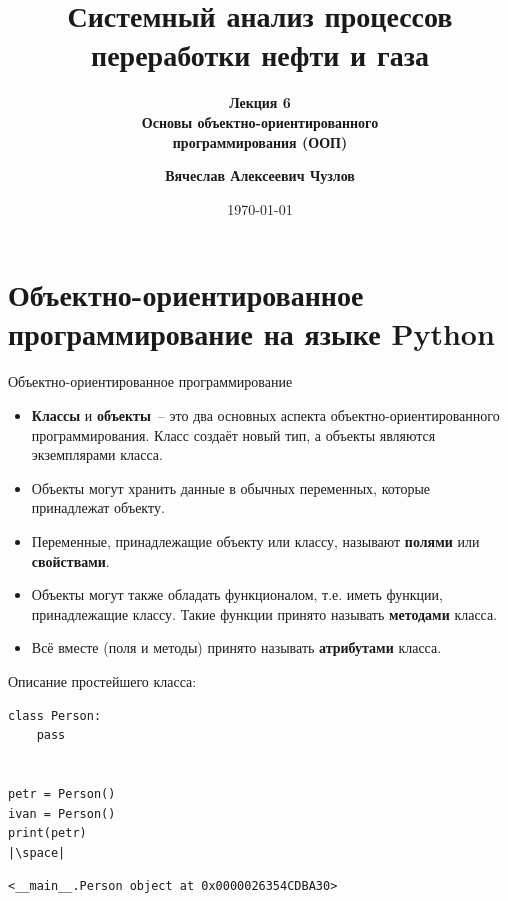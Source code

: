 \documentclass[aspectratio=169, mathserif]{beamer}	%
\title{\Large{Системный анализ процессов переработки нефти и газа}}
\subtitle{\textcolor{tpugreen}{\textbf{Лекция 6}} \\ \textbf{Основы объектно-ориентированного \\ программирования (ООП)}}
\author[]{\textbf{Вячеслав Алексеевич Чузлов}}
\institute{к.т.н., доцент ОХИ ИШПР}
\date{\today}
\begin{document}

\titleframe		%

\tocframe{}		%




\section{Объектно-ориентированное \\ программирование на языке Python}
\sectionframe

\begin{frame}[fragile]{Объектно-ориентированное программирование}
\scriptsize
\begin{itemize}
	\item \textcolor{tpugreen}{\textbf{Классы}} и \textcolor{tpugreen}{\textbf{объекты}}~-- это два основных аспекта объектно-ориентированного программирования. Класс создаёт новый тип, а объекты являются экземплярами класса.
	\item Объекты могут хранить данные в обычных переменных, которые принадлежат объекту.
	\item Переменные, принадлежащие объекту или классу, называют \textcolor{extraorange}{\textbf{полями}} или \textcolor{extraorange}{\textbf{свойствами}}.
	\item Объекты могут также обладать функционалом, т.е. иметь функции, принадлежащие классу. Такие функции принято называть \textcolor{extraorange}{\textbf{методами}} класса.
	\item Всё вместе (поля и методы) принято называть \textcolor{extraorange}{\textbf{атрибутами}} класса.
\end{itemize}
\vfill
Описание простейшего класса:
\begin{verbatim}
class Person:
    pass


petr = Person()
ivan = Person()
print(petr)
|\space|
\end{verbatim}
\begin{verbatim}
<__main__.Person object at 0x0000026354CDBA30>
\end{verbatim}
\vfill
\end{frame}
\end{document}
